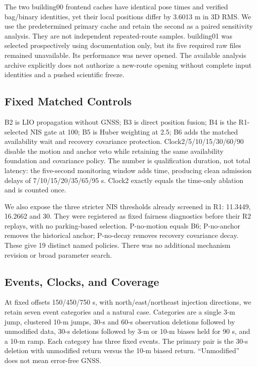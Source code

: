 \documentclass[conference]{IEEEtran}
\begin{document}
The two building00 frontend caches have identical pose times and verified bag/binary identities, yet their local positions differ by 3.6013 m in 3D RMS. We use the predetermined primary cache and retain the second as a paired sensitivity analysis. They are not independent repeated-route samples. building01 was selected prospectively using documentation only, but its five required raw files remained unavailable. Its performance was never opened. The available analysis archive explicitly does not authorize a new-route opening without complete input identities and a pushed scientific freeze.

\subsection{Fixed Matched Controls}
B2 is LIO propagation without GNSS; B3 is direct position fusion; B4 is the R1-selected NIS gate at 100; B5 is Huber weighting at 2.5; B6 adds the matched availability wait and recovery covariance protection. Clock2/5/10/15/30/60/90 disable the motion and anchor veto while retaining the same availability foundation and covariance policy. The number is qualification duration, not total latency: the five-second monitoring window adds time, producing clean admission delays of 7/10/15/20/35/65/95 s. Clock2 exactly equals the time-only ablation and is counted once.

We also expose the three stricter NIS thresholds already screened in R1: 11.3449, 16.2662 and 30. They were registered as fixed fairness diagnostics before their R2 replays, with no parking-based selection. P-no-motion equals B6; P-no-anchor removes the historical anchor; P-no-decay removes recovery covariance decay. These give 19 distinct named policies. There was no additional mechanism revision or broad parameter search.

\subsection{Events, Clocks, and Coverage}
At fixed offsets 150/450/750 s, with north/east/northeast injection directions, we retain seven event categories and a natural case. Categories are a single 3-m jump, clustered 10-m jumps, 30-s and 60-s observation deletions followed by unmodified data, 30-s deletions followed by 3-m or 10-m biases held for 90 s, and a 10-m ramp. Each category has three fixed events. The primary pair is the 30-s deletion with unmodified return versus the 10-m biased return. ``Unmodified'' does not mean error-free GNSS.
\end{document}
